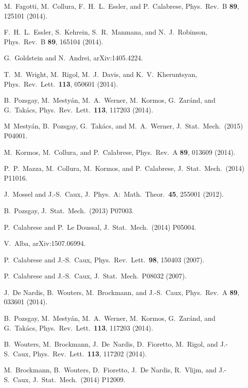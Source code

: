 \documentclass[11pt]{iopart}
\begin{document}
\begin{thebibliography}{99}
M.~Fagotti, M.~Collura, F.~H.~L.~Essler, and P.~Calabrese, Phys.\ Rev.\ B {\bf 89}, 
125101 (2014).

F.~H.~L.~Essler, S.~Kehrein, S.~R.~Manmana, and N.~J.~Robinson, Phys.\ Rev.\ B {\bf 89}, 
165104 (2014).

G.~Goldstein and N.~Andrei, arXiv:1405.4224. 

T.~M.~Wright, M.~Rigol, M.~J.~Davis, and K.~V.~Kheruntsyan, Phys.\ Rev.\ Lett.\ {\bf 113}, 
050601 (2014).

B.~Pozsgay, M.~Mesty\'an, M.~A.~Werner, M.~Kormos, G.~Zar\'and, and G.~Tak\'acs,
Phys.\ Rev.\ Lett.\ {\bf 113}, 117203 (2014). 

M~Mesty\'an, B.~Pozsgay, G.~Tak\'acs, and M.~A.~Werner, J.\ Stat.\ Mech.\ (2015) 
P04001.

M.~Kormos, M.~Collura, and P.~Calabrese, Phys.\ Rev.\ A {\bf 89}, 013609 
(2014).

P.~P.~Mazza, M.\ Collura, M.\ Kormos, and P.\ Calabrese, J.\ Stat.\ Mech.\  
(2014) P11016.

J.~Mossel and J.-S.~Caux, J.\ Phys.\ A:\ Math.\ Theor.\ {\bf 45}, 
255001 (2012). 

B.~Pozsgay, J.\ Stat.\ Mech.\ (2013) P07003. 

P.~Calabrese and P.~Le Doussal, J.\ Stat.\ Mech.\ (2014) P05004. 

V.~Alba, arXiv:1507.06994.

P.~Calabrese and J.-S.~Caux, Phys.\ Rev.\ Lett.\ {\bf 98}, 150403 (2007).

P.~Calabrese and J.-S.~Caux, J.\ Stat.\ Mech.\ P08032 (2007).

J.~De Nardis, B.~Wouters, M.~Brockmann, and J.-S.~Caux, Phys.\ Rev.\ A {\bf 89}, 
033601 (2014). 

B.~Pozsgay, M.~Mesty\'an, M.~A.~Werner, M.~Kormos, G.~Zar\'and, and G.~Tak\'acs,
Phys.\ Rev.\ Lett.\ {\bf 113}, 117203 (2014). 

B.~Wouters, M.~Brockmann, J.~De~Nardis, D.~Fioretto, M.~Rigol, and J.-S.~Caux, 
Phys.\ Rev.\ Lett.\ {\bf 113}, 117202 (2014). 

M.~Brockmann, B.~Wouters, D.~Fioretto, J.~De Nardis, R.~Vlijm, and J.-S.~Caux, 
J.\ Stat.\ Mech.\ (2014) P12009. 


\end{thebibliography}
\end{document}
